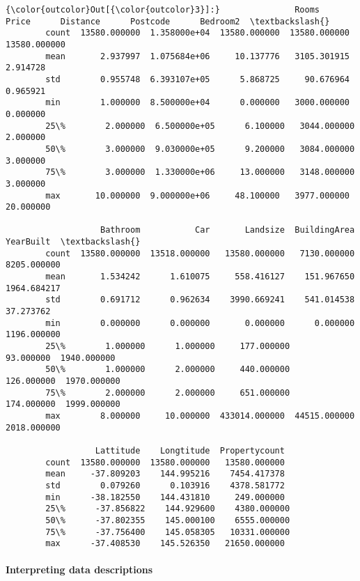 \documentclass[11pt]{article}
\begin{document}
\begin{Verbatim}[commandchars=\\\{\}]
{\color{outcolor}Out[{\color{outcolor}3}]:}               Rooms         Price      Distance      Postcode      Bedroom2  \textbackslash{}
        count  13580.000000  1.358000e+04  13580.000000  13580.000000  13580.000000   
        mean       2.937997  1.075684e+06     10.137776   3105.301915      2.914728   
        std        0.955748  6.393107e+05      5.868725     90.676964      0.965921   
        min        1.000000  8.500000e+04      0.000000   3000.000000      0.000000   
        25\%        2.000000  6.500000e+05      6.100000   3044.000000      2.000000   
        50\%        3.000000  9.030000e+05      9.200000   3084.000000      3.000000   
        75\%        3.000000  1.330000e+06     13.000000   3148.000000      3.000000   
        max       10.000000  9.000000e+06     48.100000   3977.000000     20.000000   
        
                   Bathroom           Car       Landsize  BuildingArea    YearBuilt  \textbackslash{}
        count  13580.000000  13518.000000   13580.000000   7130.000000  8205.000000   
        mean       1.534242      1.610075     558.416127    151.967650  1964.684217   
        std        0.691712      0.962634    3990.669241    541.014538    37.273762   
        min        0.000000      0.000000       0.000000      0.000000  1196.000000   
        25\%        1.000000      1.000000     177.000000     93.000000  1940.000000   
        50\%        1.000000      2.000000     440.000000    126.000000  1970.000000   
        75\%        2.000000      2.000000     651.000000    174.000000  1999.000000   
        max        8.000000     10.000000  433014.000000  44515.000000  2018.000000   
        
                  Lattitude    Longtitude  Propertycount  
        count  13580.000000  13580.000000   13580.000000  
        mean     -37.809203    144.995216    7454.417378  
        std        0.079260      0.103916    4378.581772  
        min      -38.182550    144.431810     249.000000  
        25\%      -37.856822    144.929600    4380.000000  
        50\%      -37.802355    145.000100    6555.000000  
        75\%      -37.756400    145.058305   10331.000000  
        max      -37.408530    145.526350   21650.000000  
\end{Verbatim}
            
    \hypertarget{interpreting-data-descriptions}{%
\paragraph{Interpreting data
descriptions}\label{interpreting-data-descriptions}}
\end{document}
